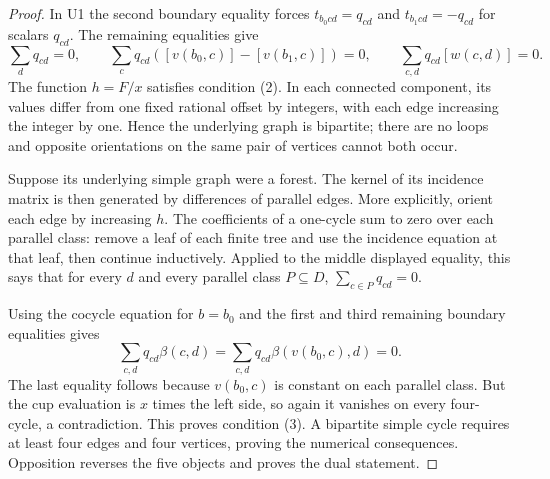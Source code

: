 \begin{proof}
In U1 the second boundary equality forces
$t_{b_0cd}=q_{cd}$ and $t_{b_1cd}=-q_{cd}$ for scalars $q_{cd}$.
The remaining equalities give
\[
 \sum_dq_{cd}=0,\qquad
 \sum_cq_{cd}([v(b_0,c)]-[v(b_1,c)])=0,\qquad
 \sum_{c,d}q_{cd}[w(c,d)]=0.
\]
The function $h=F/x$ satisfies condition (2). In each connected
component, its values differ from one fixed rational offset by
integers, with each edge increasing the integer by one. Hence the
underlying graph is bipartite; there are no loops and opposite
orientations on the same pair of vertices cannot both occur.

Suppose its underlying simple graph were a forest. The kernel of
its incidence matrix is then generated by differences of parallel
edges. More explicitly, orient each edge by increasing $h$.
The coefficients of a one-cycle sum to zero over each parallel
class: remove a leaf of each finite tree and use the incidence
equation at that leaf, then continue inductively. Applied to the
middle displayed equality, this says that for every $d$ and every
parallel class $P\subseteq D$, $\sum_{c\in P}q_{cd}=0$.

Using the cocycle equation for $b=b_0$ and the first and third
remaining boundary equalities gives
\[
 \sum_{c,d}q_{cd}\beta(c,d)
 =\sum_{c,d}q_{cd}\beta(v(b_0,c),d)=0.
\]
The last equality follows because $v(b_0,c)$ is constant on each
parallel class. But the cup evaluation is $x$ times the left side,
so again it vanishes on every four-cycle, a contradiction. This
proves condition (3). A bipartite simple cycle requires at least
four edges and four vertices, proving the numerical consequences.
Opposition reverses the five objects and proves the dual statement.
\end{proof}
